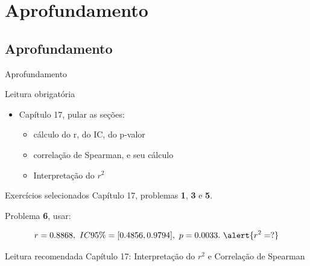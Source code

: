\documentclass{beamer}
\begin{document}
\section{Aprofundamento}

\subsection{Aprofundamento}

\begin{frame}{Aprofundamento}
  \begin{block}{Leitura obrigatória}
    \begin{itemize}
      \small
    \item Capítulo 17, pular as seções:
      \begin{itemize}
        \footnotesize
      \item cálculo do r, do IC, do p-valor
      \item correlação de Spearman, e seu cálculo
      \item Interpretação do $r^2$
      \end{itemize}
    \end{itemize}
  \end{block}
  \begin{block}{Exercícios selecionados}
    \scriptsize
    Capítulo 17, problemas {\bf 1}, {\bf 3} e {\bf 5}.

    \medskip
    Problema {\bf 6}, usar:

    $$r=0.8868,\ IC95\%=[0.4856, 0.9794],\ p = 0.0033.\ \alert{r^2=?}$$ 
  \end{block}
  \begin{block}{Leitura recomendada}
    \small
    Capítulo 17: Interpretação do $r^2$ e Correlação de Spearman
  \end{block}
\end{frame}
\end{document}

